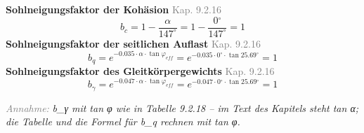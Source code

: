 \documentclass[11pt,a4paper]{article}
\newcommand{\normref}[1]{{\small\textcolor{gray}{#1}}}
\newcommand{\hinweis}[2]{\par\noindent\textcolor{gray}{\textit{#1:}} \textit{#2}\par}
\begin{document}
\noindent\textbf{Sohlneigungsfaktor der Kohäsion} \hfill \normref{Kap. 9.2.16}
\begin{equation*}
b_c = 1 - \frac{\alpha}{147^\circ} = 1 - \frac{0{}^{\circ}}{147^\circ} = 1
\end{equation*}
\noindent\textbf{Sohlneigungsfaktor der seitlichen Auflast} \hfill \normref{Kap. 9.2.16}
\begin{equation*}
b_q = e^{-0.035 \cdot \alpha \cdot \tan \varphi_{eff}} = e^{-0.035 \cdot 0{}^{\circ} \cdot \tan 25.69{}^{\circ}} = 1
\end{equation*}
\noindent\textbf{Sohlneigungsfaktor des Gleitkörpergewichts} \hfill \normref{Kap. 9.2.16}
\begin{equation*}
b_{\gamma} = e^{-0.047 \cdot \alpha \cdot \tan \varphi_{eff}} = e^{-0.047 \cdot 0{}^{\circ} \cdot \tan 25.69{}^{\circ}} = 1
\end{equation*}
\hinweis{Annahme}{b\_γ mit tan φ wie in Tabelle 9.2.18 -- im Text des Kapitels steht tan α; die Tabelle und die Formel für b\_q rechnen mit tan φ.}
\end{document}
